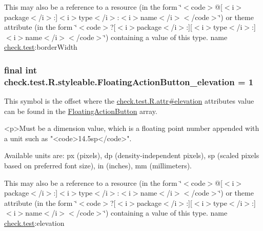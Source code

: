 This may also be a reference to a resource (in the form \char`\"{}$<$code$>$@\mbox{[}$<$i$>$package$<$/i$>$\+:\mbox{]}$<$i$>$type$<$/i$>$\+:$<$i$>$name$<$/i$>$$<$/code$>$\char`\"{}) or theme attribute (in the form \char`\"{}$<$code$>$?\mbox{[}$<$i$>$package$<$/i$>$\+:\mbox{]}\mbox{[}$<$i$>$type$<$/i$>$\+:\mbox{]}$<$i$>$name$<$/i$>$$<$/code$>$\char`\"{}) containing a value of this type.  name \hyperlink{namespacecheck_1_1test}{check.\+test}\+:border\+Width \hypertarget{classcheck_1_1test_1_1_r_1_1styleable_af996a59bf7a9501bc11bbb4a5451900e}{}
\subsubsection[{Floating\+Action\+Button\+\_\+elevation}]{\setlength{\rightskip}{0pt plus 5cm}final int check.\+test.\+R.\+styleable.\+Floating\+Action\+Button\+\_\+elevation = 1\hspace{0.3cm}{\ttfamily [static]}}\label{classcheck_1_1test_1_1_r_1_1styleable_af996a59bf7a9501bc11bbb4a5451900e}
This symbol is the offset where the \hyperlink{classcheck_1_1test_1_1_r_1_1attr_acf20b055f3e563dc5c426990bf2b3b7e}{check.\+test.\+R.\+attr\#elevation} attribute\textquotesingle{}s value can be found in the \hyperlink{classcheck_1_1test_1_1_r_1_1styleable_ae6f501c03537511d2edaad8d699781da}{Floating\+Action\+Button} array.

\begin{DoxyVerb}      <p>Must be a dimension value, which is a floating point number appended with a unit such as "<code>14.5sp</code>".
\end{DoxyVerb}
 Available units are\+: px (pixels), dp (density-\/independent pixels), sp (scaled pixels based on preferred font size), in (inches), mm (millimeters). 

This may also be a reference to a resource (in the form \char`\"{}$<$code$>$@\mbox{[}$<$i$>$package$<$/i$>$\+:\mbox{]}$<$i$>$type$<$/i$>$\+:$<$i$>$name$<$/i$>$$<$/code$>$\char`\"{}) or theme attribute (in the form \char`\"{}$<$code$>$?\mbox{[}$<$i$>$package$<$/i$>$\+:\mbox{]}\mbox{[}$<$i$>$type$<$/i$>$\+:\mbox{]}$<$i$>$name$<$/i$>$$<$/code$>$\char`\"{}) containing a value of this type.  name \hyperlink{namespacecheck_1_1test}{check.\+test}\+:elevation \hypertarget{classcheck_1_1test_1_1_r_1_1styleable_a9f7ddd112d179b839c66772f44baf8fc}{}
